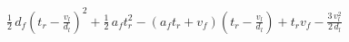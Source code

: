 $\frac{1}{2} \, d_f {\left(t_r - \frac{v_l}{d_l}\right)}^{2} + \frac{1}{2} \, a_f t_r^{2} - {\left(a_f t_r + v_f\right)} {\left(t_r - \frac{v_l}{d_l}\right)} + t_r v_f - \frac{3 \, v_l^{2}}{2 \, d_l}$
